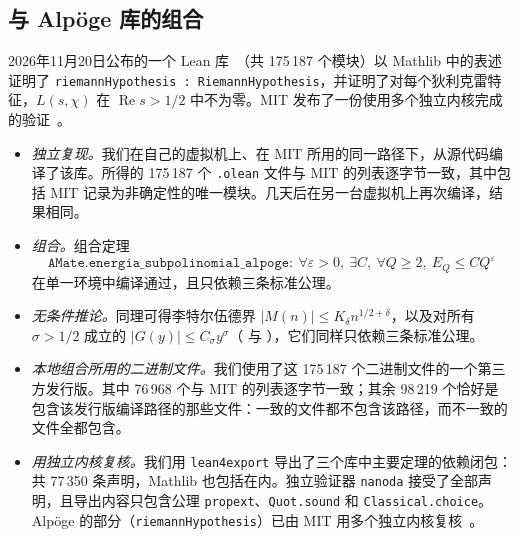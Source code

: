 \documentclass[11pt,a4paper]{amsart}
\theoremstyle{definition}
\theoremstyle{remark}
\renewcommand{\Re}{\operatorname{Re}}
\begin{document}
\subsection*{与 Alp\"oge 库的组合}
2026年11月20日公布的一个 Lean 库~\cite{Alpoge}（共 175\,187 个模块）以 Mathlib 中的表述证明了 \texttt{riemannHypothesis : RiemannHypothesis}，并证明了对每个狄利克雷特征，$L(s,\chi)$ 在 $\Re s>1/2$ 中不为零。MIT 发布了一份使用多个独立内核完成的验证~\cite{MIT}。
\begin{itemize}
\item \emph{独立复现。}我们在自己的虚拟机上、在 MIT 所用的同一路径下，从源代码编译了该库。所得的 175\,187 个 \texttt{.olean} 文件与 MIT 的列表逐字节一致，其中包括 MIT 记录为非确定性的唯一模块。几天后在另一台虚拟机上再次编译，结果相同。
\item \emph{组合。}组合定理
\[
\texttt{AMate.energia\_subpolinomial\_alpoge}:\ \forall\varepsilon>0,\ \exists C,\ \forall Q\ge2,\ E_Q\le CQ^\varepsilon
\]
在单一环境中编译通过，且只依赖三条标准公理。
\item \emph{无条件推论。}同理可得李特尔伍德界 $|M(n)|\le K_\delta n^{1/2+\delta}$，以及对所有 $\sigma>1/2$ 成立的 $|G(y)|\le C_{\sigma}y^{\sigma}$（ 与 ），它们同样只依赖三条标准公理。
\item \emph{本地组合所用的二进制文件。}我们使用了这 175\,187 个二进制文件的一个第三方发行版。其中 76\,968 个与 MIT 的列表逐字节一致；其余 98\,219 个恰好是包含该发行版编译路径的那些文件：一致的文件都不包含该路径，而不一致的文件全都包含。
\item \emph{用独立内核复核。}我们用 \texttt{lean4export} 导出了三个库中主要定理的依赖闭包：共 77\,350 条声明，Mathlib 也包括在内。独立验证器 \texttt{nanoda} 接受了全部声明，且导出内容只包含公理 \texttt{propext}、\texttt{Quot.sound} 和 \texttt{Classical.choice}。Alp\"oge 的部分（\texttt{riemannHypothesis}）已由 MIT 用多个独立内核复核~\cite{MIT}。
\end{itemize}
\end{document}
